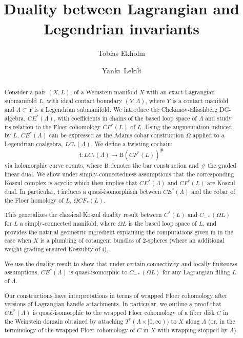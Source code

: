 \documentclass{gtpart}
\title{Duality between Lagrangian and Legendrian invariants}
\author{Tobias Ekholm}
\author{Yank\i\ Lekili}
\renewcommand{\t}{\mathfrak{t}}
\renewcommand{\Bar}{\mathrm{B}}
\begin{document}
\begin{abstract} 
Consider a pair $(X,L)$, of a Weinstein manifold $X$ with an exact Lagrangian submanifold $L$, with
    ideal contact boundary $(Y,\Lambda)$, where $Y$ is a contact manifold and $\Lambda\subset Y$ is
    a Legendrian submanifold. We introduce the Chekanov-Eliashberg DG-algebra, $CE^{\ast}(\Lambda)$,
    with coefficients in chains of the based loop space of $\Lambda$ and study its relation to the
    Floer cohomology $CF^{\ast}(L)$ of $L$.  Using the augmentation induced by $L$,
    $CE^{\ast}(\Lambda)$ can be expressed as the Adams cobar
    construction $\Omega$ applied to a Legendrian coalgebra, $LC_{\ast}(\Lambda)$. We define a twisting cochain: 
\[ 
    \t\colon LC_{\ast}(\Lambda) \to \Bar (CF^*(L))^\# 
\] 
via holomorphic curve counts,
where $\Bar$ denotes the bar construction and $\#$ the graded linear dual. We show under simply-connectedness assumptions that the corresponding Koszul complex is acyclic which then implies that $CE^*(\Lambda)$ and $CF^{\ast}(L)$ are Koszul dual. In particular, $\t$ induces a quasi-isomorphism between $CE^*(\Lambda)$ and the cobar of the Floer homology of $L$, $\Omega CF_*(L)$. 

This generalizes the classical Koszul duality result between $C^*(L)$ and $C_{-*}(\Omega L)$ for $L$ a simply-connected manifold, where $\Omega L$ is the based loop space of $L$, and provides the natural geometric ingredient explaining the computations given in \cite{EtLe} in the case when $X$ is a plumbing of cotangent bundles of 2-spheres (where an additional weight grading ensured Koszulity of $\t$).  

We use the duality result to show that under certain connectivity and locally finiteness
    assumptions, $CE^*(\Lambda)$ is quasi-isomorphic to $C_{-*}(\Omega L)$ for any Lagrangian filling $L$ of $\Lambda$.    
    
Our constructions have interpretations in terms of wrapped Floer cohomology after versions of
    Lagrangian handle attachments. In particular, we outline a proof that $CE^{\ast}(\Lambda)$ is
    quasi-isomorphic to the wrapped Floer cohomology of a fiber disk $C$ in the Weinstein domain
    obtained by attaching $T^{\ast}(\Lambda\times[0,\infty))$ to $X$ along $\Lambda$ (or, in the
    terminology of \cite{sylvan} the wrapped Floer cohomology of $C$ in $X$ with wrapping stopped by $\Lambda$). 
\end{abstract}
\maketitle
\end{document}
